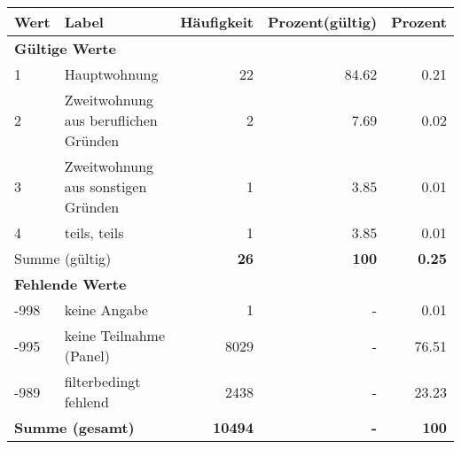      \begin{longtable}{lXrrr}
     \toprule
     \textbf{Wert} & \textbf{Label} & \textbf{Häufigkeit} & \textbf{Prozent(gültig)} & \textbf{Prozent} \\
     \endhead
     \midrule
     \multicolumn{5}{l}{\textbf{Gültige Werte}}\\

     1 &
     \multicolumn{1}{X}{ Hauptwohnung   } &


       \num{22} &
       \num[round-mode=places,round-precision=2]{84,62} &
         \num[round-mode=places,round-precision=2]{0,21} \\

     2 &
     \multicolumn{1}{X}{ Zweitwohnung aus beruflichen Gründen   } &


       \num{2} &
       \num[round-mode=places,round-precision=2]{7,69} &
         \num[round-mode=places,round-precision=2]{0,02} \\

     3 &
     \multicolumn{1}{X}{ Zweitwohnung aus sonstigen Gründen   } &


       \num{1} &
       \num[round-mode=places,round-precision=2]{3,85} &
         \num[round-mode=places,round-precision=2]{0,01} \\

     4 &
     \multicolumn{1}{X}{ teils, teils   } &


       \num{1} &
       \num[round-mode=places,round-precision=2]{3,85} &
         \num[round-mode=places,round-precision=2]{0,01} \\
     \midrule
     \multicolumn{2}{l}{Summe (gültig)} &
       \textbf{\num{26}} &
     \textbf{100} &
       \textbf{\num[round-mode=places,round-precision=2]{0,25}} \\
     \multicolumn{5}{l}{\textbf{Fehlende Werte}}\\
       -998 &
       keine Angabe &
         \num{1} &
        - &
         \num[round-mode=places,round-precision=2]{0,01} \\
       -995 &
       keine Teilnahme (Panel) &
         \num{8029} &
        - &
         \num[round-mode=places,round-precision=2]{76,51} \\
       -989 &
       filterbedingt fehlend &
         \num{2438} &
        - &
         \num[round-mode=places,round-precision=2]{23,23} \\
     \midrule
     \multicolumn{2}{l}{\textbf{Summe (gesamt)}} &
          \textbf{\num{10494}} &
        \textbf{-} &
        \textbf{100} \\
     \bottomrule
     \end{longtable}
     
